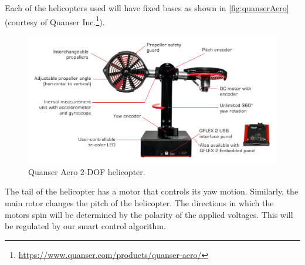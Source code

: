 \documentclass[letterpaper, 10pt, conference]{ieeeconf}
\begin{document}
Each of the helicopters used will have fixed bases as shown in \autoref{fig:quanserAero} (courtesy of Quanser Inc.\footnote{\url{https://www.quanser.com/products/quanser-aero/}}). %
%
\begin{figure}
  \centering
  \includegraphics[scale=0.6]{figs/img/quanserAero}
  \caption{Quanser Aero 2-DOF helicopter.}
  \label{fig:quanserAero}
\end{figure}
%
The tail of the helicopter has a motor that controls its yaw motion.  Similarly, the main rotor changes the pitch of the helicopter.  The directions in which the motors spin will be determined by the polarity of the applied voltages.  This will be regulated by our smart control algorithm.
\end{document}
